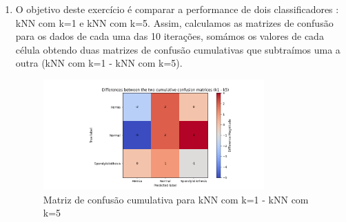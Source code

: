 \documentclass[a4paper,12pt]{article} %
\begin{document}
\begin{enumerate}
\begin{lstlisting}[language=Python]
    ## train and assess
    gaussNB.fit(X_train, y_train)
    y_pred_gauss = gaussNB.predict(X_test)
    acc_folds_gauss.append(round(metrics.accuracy_score(y_test, y_pred_gauss),4))
    
    knn_predictor.fit(X_train, y_train)
    y_pred_knn = knn_predictor.predict(X_test)
    acc_folds_knn.append(round(metrics.accuracy_score(y_test, y_pred_knn),4))

print("Fold accuracies GaussianNB:", acc_folds_gauss)
print("Fold accuracies kNN:", acc_folds_knn)

plt.boxplot([acc_folds_gauss, acc_folds_knn], labels=['GaussianNB', 'kNN'])
plt.title('Accuracies for GaussianNB and kNN')
plt.xlabel('Classifiers')
plt.ylabel('Accuracy')
plt.savefig('ex1a_boxplot.png')
plt.show()
        \end{lstlisting}

    
    (b) Concluímos que a hipótese nula (H0: a médias das duas populações de accuracies é igual) não é rejeitada (o valor do \textit{p-value} é superior a 0.05), logo não há evidência estatística para afirmar que o kNN é estatisticamente superior ao GaussianNB. 
    \\ \\
    Código utilizado:
    \begin{lstlisting}[language=Python]
#b) 
Null Hypothesis: kNN is not statistically superior to GaussianNB
hypothesis = stats.ttest_rel(acc_folds_knn, acc_folds_gauss, alternative='greater')

if hypothesis[1] < 0.05:
    print("The null hypothesis is rejected and kNN is statistically superior to GaussianNB")
    
else:
    print("The null hypothesis is not rejected and there is no statistical evidence that kNN is superior to GaussianNB")

print("p-value:", hypothesis[1])
    \end{lstlisting}

    \item O objetivo deste exercício é comparar a performance de dois classificadores : kNN com k=1 e kNN com k=5. 
    Assim, calculamos as matrizes de confusão para os dados de cada uma das 10 iterações, somámos os valores de cada célula obtendo duas matrizes de confusão cumulativas que subtraímos uma a outra (kNN com k=1 - kNN com k=5).
    \begin{figure}[H]
        \centering
        \includegraphics[width=0.8\textwidth]{ex2_cummatrix.png}
        \caption{Matriz de confusão cumulativa para kNN com k=1 - kNN com k=5}
        \label{fig:ex2a}
    \end{figure}


\end{enumerate}
\end{document}
